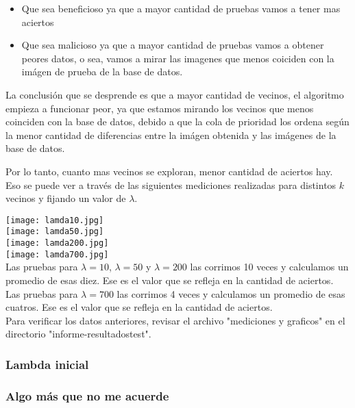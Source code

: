 \begin{itemize}
  \item Que sea beneficioso ya que a mayor cantidad de pruebas vamos a tener mas aciertos
  \item Que sea malicioso ya que a mayor cantidad de pruebas vamos a obtener peores datos, o sea, vamos a mirar las imagenes que menos coiciden con la imágen de prueba de la base de datos.
\end{itemize}

La conclusión que se desprende es que a mayor cantidad de vecinos, el algoritmo empieza a funcionar peor, ya que estamos mirando los vecinos que menos coinciden con la base de datos, debido a que la cola de prioridad los ordena según la menor cantidad de diferencias entre la imágen obtenida y las imágenes de la base de datos. 

Por lo tanto, cuanto mas vecinos se exploran, menor cantidad de aciertos hay. Eso se puede ver a través de las siguientes mediciones realizadas para distintos $k$ vecinos y fijando un valor de $\lambda$.

\texttt{[image: lamda10.jpg]}\\
\texttt{[image: lamda50.jpg]}\\
\texttt{[image: lamda200.jpg]}\\
\texttt{[image: lamda700.jpg]}\\

Las pruebas para $\lambda = 10$, $\lambda = 50$ y $\lambda = 200$ las corrimos 10 veces y calculamos un promedio de esas diez. Ese es el valor que se refleja en la cantidad de aciertos. \\

Las pruebas para $\lambda = 700$ las corrimos 4 veces y calculamos un promedio de esas cuatros. Ese es el valor que se refleja en la cantidad de aciertos. \\

Para verificar los datos anteriores, revisar el archivo "mediciones y graficos" en el directorio "informe-resultadostest".




\subsubsection{Lambda inicial}

\subsubsection{Algo más que no me acuerde}
